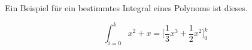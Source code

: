 \documentclass{article}
\begin{document}
  Ein Beispiel für ein bestimmtes Integral eines Polynoms ist dieses.

  \begin{displaymath}
    \int_{i=0}^k
      x^2 + x =
      \bigl[
        \frac{1}{3} x^3 + \frac{1}{2} x^2
      \bigr]_0^k
  \end{displaymath}
\end{document}
